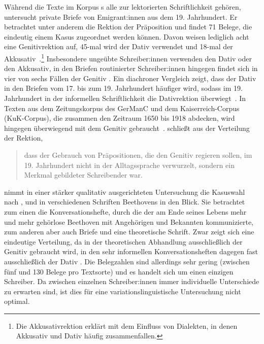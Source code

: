Während die Texte im Korpus \citeauthor{DiMeola2000}s alle zur lektorierten Schriftlichkeit gehören, untersucht \citet[]{Elspa2005} private Briefe von Emigrant:innen aus dem 19. Jahrhundert. 
Er betrachtet unter anderem die Rektion der Präposition \wegen{} und findet 71 Belege, die eindeutig einem Kasus zugeordnet werden k{\"o}nnen. 
Davon weisen lediglich acht eine Genitivrektion auf, 45-mal wird der Dativ verwendet und 18-mal der Akkusativ~\citep[s.][321]{Elspa2005}.\footnote{Die Akkusativrektion erklärt \citet[]{Elspa2005} mit dem Einfluss von Dialekten, in denen Akkusativ und Dativ häufig zusammenfallen.}
Insbesondere unge{\"u}bte Schreiber:innen verwenden den Dativ oder den Akkusativ, in den Briefen routinierter Schreiber:innen hingegen findet sich in vier von sechs Fällen der Genitiv \citep[s.][321--323]{Elspa2005}. 
Ein diachroner Vergleich zeigt, dass der Dativ in den Briefen vom 17. bis zum 19. Jahrhundert h{\"a}ufiger wird, sodass im 19. Jahrhundert in der informellen Schriftlichkeit die Dativrektion {\"u}berwiegt~\citep[s.][411]{Elspa.2015}. 
In Texten aus dem Zeitungskorpus des GerManC und dem Kaiserreich-Corpus (KuK-Corpus), die zusammen den Zeitraum 1650 bis 1918 abdecken, wird \wegen{} hingegen {\"u}berwiegend mit dem Genitiv gebraucht~\citep[s.][410]{Elspa.2015}. 
\citeauthor{Elspa2005} schlie{\ss}t aus der Verteilung der Rektion, \begin{quote}dass der Gebrauch von Pr{\"a}positionen, die den Genitiv regieren sollen, im 19. Jahrhundert nicht in der Alltagssprache verwurzelt, sondern ein Merkmal gebildeter Schreibender war.~\citep[321]{Elspa2005}\end{quote}
\citet[]{Sato.2015} nimmt in einer stärker qualitativ ausgerichteten Untersuchung die Kasuswahl nach \wegen{}, \waehrend{} und  in verschiedenen Schriften Beethovens in den Blick.  Sie betrachtet zum einen die Konversationshefte, durch die der am Ende seines Lebens mehr und mehr gehörlose Beethoven mit Angehörigen und Bekannten kommunizierte, zum anderen aber auch Briefe und eine theoretische Schrift. 
Zwar zeigt sich eine eindeutige Verteilung, da in der theoretischen Abhandlung ausschließlich der Genitiv gebraucht wird, in den sehr informellen Konversationsheften dagegen fast ausschließlich der Dativ \citep[s.][27]{Sato.2015}. 
Die Belegzahlen sind allerdings sehr gering (zwischen fünf und 130 Belege pro Textsorte) und es handelt sich um einen einzigen Schreiber. 
Da zwischen einzelnen Schreiber:innen immer individuelle Unterschiede zu erwarten sind, ist dies für eine variationslinguistische Untersuchung nicht optimal. 
